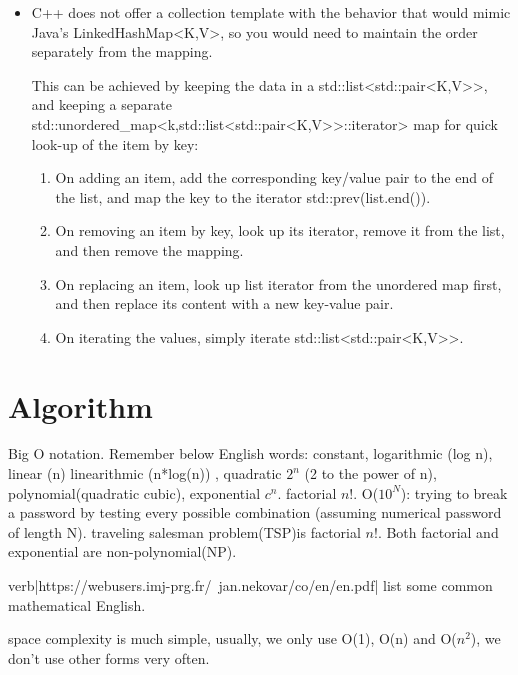 \documentclass[a4paper,11pt,twoside]{book}
\begin{document}
\begin{itemize}
	
	\item C++ does not offer a collection template with the behavior that would mimic Java's LinkedHashMap<K,V>, so you would need to maintain the order separately from the mapping.
	
	This can be achieved by keeping the data in a std::list<std::pair<K,V>>, and keeping a separate std::unordered\_map<k,std::list<std::pair<K,V>>::iterator> map for quick look-up of the item by key:
	
	\begin{enumerate}
		\item On adding an item, add the corresponding key/value pair to the end of the list, and map the key to the iterator std::prev(list.end()).
		
		\item On removing an item by key, look up its iterator, remove it from the list, and then remove the mapping.
		
		\item On replacing an item, look up list iterator from the unordered map first, and then replace its content with a new key-value pair.
		
		\item On iterating the values, simply iterate std::list<std::pair<K,V>>.
	\end{enumerate}
	
	
\end{itemize}


\chapter{Algorithm}

	\par Big O notation. Remember below English words: constant, logarithmic (log n), linear (n)  linearithmic (n*log(n)) , quadratic $2^{n}$ (2 to the power of n), polynomial(quadratic cubic),  exponential $c^{n}$.  factorial $n!$.  O($10^{N}$): trying to break a password by testing every possible combination (assuming numerical password of length N).  traveling salesman problem(TSP)is factorial $n!$.  Both factorial and exponential are non-polynomial(NP). 

	\par verb|https://webusers.imj-prg.fr/~jan.nekovar/co/en/en.pdf| list some common mathematical English.  

	\par space complexity is much simple, usually, we only use O(1), O(n) and O($n^{2}$), we don't use other forms very often.  
\end{document}
